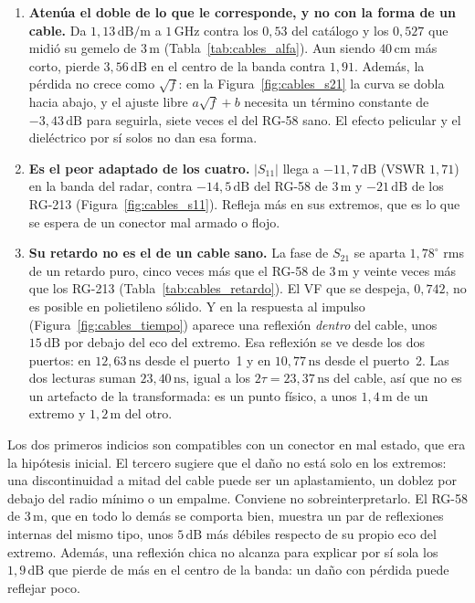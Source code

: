 \documentclass[12pt, a4paper, twoside]{report}
\begin{document}
\begin{enumerate}
  \item \textbf{Atenúa el doble de lo que le corresponde, y no con la
    forma de un cable.} Da $1{,}13\,\text{dB/m}$ a $1\,\text{GHz}$
    contra los $0{,}53$ del catálogo y los $0{,}527$ que midió su
    gemelo de $3\,\text{m}$ (Tabla~\ref{tab:cables_alfa}). Aun siendo
    $40\,\text{cm}$ más corto, pierde $3{,}56\,\text{dB}$ en el centro
    de la banda contra $1{,}91$. Además, la pérdida no crece como
    $\sqrt{f}$: en la Figura~\ref{fig:cables_s21} la curva se dobla
    hacia abajo, y el ajuste libre $a\sqrt{f}+b$ necesita un término
    constante de $-3{,}43\,\text{dB}$ para seguirla, siete veces el del
    RG-58 sano. El efecto pelicular y el dieléctrico por sí solos
    no dan esa forma.
  \item \textbf{Es el peor adaptado de los cuatro.} $|S_{11}|$ llega a
    $-11{,}7\,\text{dB}$ (VSWR $1{,}71$) en la banda del radar, contra
    $-14{,}5\,\text{dB}$ del RG-58 de $3\,\text{m}$ y
    $-21\,\text{dB}$ de los RG-213 (Figura~\ref{fig:cables_s11}).
    Refleja más en sus extremos, que es lo que se espera de un conector
    mal armado o flojo.
  \item \textbf{Su retardo no es el de un cable sano.} La fase de
    $S_{21}$ se aparta $1{,}78^\circ$ rms de un retardo puro, cinco
    veces más que el RG-58 de $3\,\text{m}$ y veinte veces más que los
    RG-213 (Tabla~\ref{tab:cables_retardo}). El VF que se despeja,
    $0{,}742$, no es posible en polietileno sólido. Y en la respuesta
    al impulso (Figura~\ref{fig:cables_tiempo}) aparece una reflexión
    \emph{dentro} del cable, unos $15\,\text{dB}$ por debajo del eco
    del extremo. Esa reflexión se ve desde los dos puertos: en
    $12{,}63\,\text{ns}$ desde el puerto~1 y en $10{,}77\,\text{ns}$
    desde el puerto~2. Las dos lecturas suman $23{,}40\,\text{ns}$,
    igual a los $2\tau = 23{,}37\,\text{ns}$ del cable, así que no es
    un artefacto de la transformada: es un punto físico, a unos
    $1{,}4\,\text{m}$ de un extremo y $1{,}2\,\text{m}$ del otro.
\end{enumerate}

Los dos primeros indicios son compatibles con un conector en mal
estado, que era la hipótesis inicial. El tercero sugiere que el daño
no está solo en los extremos: una discontinuidad a mitad del cable
puede ser un aplastamiento, un doblez por debajo del radio mínimo o un
empalme. Conviene no sobreinterpretarlo. El RG-58 de $3\,\text{m}$,
que en todo lo demás se comporta bien, muestra un par de reflexiones
internas del mismo tipo, unos $5\,\text{dB}$ más débiles respecto de su
propio eco del extremo. Además, una reflexión chica no alcanza para
explicar por sí sola los $1{,}9\,\text{dB}$ que pierde de más en el
centro de la banda: un daño con pérdida puede reflejar poco.
\end{document}
